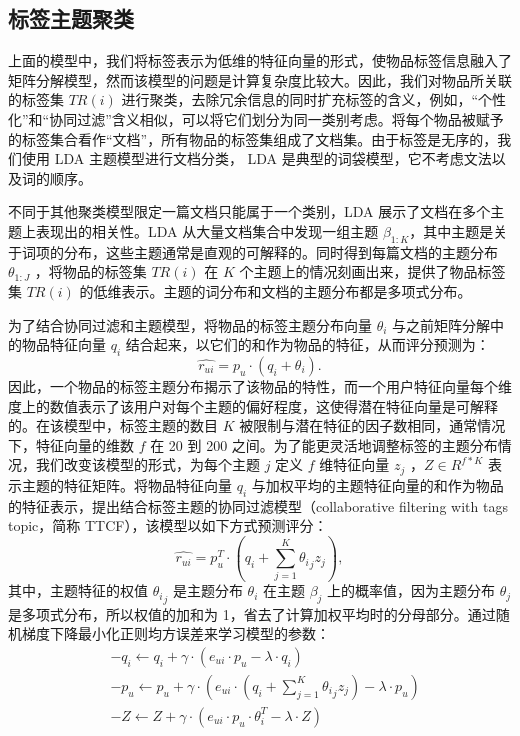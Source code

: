 \subsection{标签主题聚类}

上面的模型中，我们将标签表示为低维的特征向量的形式，使物品标签信息融入了矩阵分解模型，然而该模型的问题是计算复杂度比较大。因此，我们对物品所关联的标签集 $TR(i)$ 进行聚类，去除冗余信息的同时扩充标签的含义，例如，“个性化”和“协同过滤”含义相似，可以将它们划分为同一类别考虑。将每个物品被赋予的标签集合看作“文档”，所有物品的标签集组成了文档集。由于标签是无序的，我们使用 LDA 主题模型进行文档分类， LDA 是典型的词袋模型，它不考虑文法以及词的顺序。

不同于其他聚类模型限定一篇文档只能属于一个类别，LDA 展示了文档在多个主题上表现出的相关性。LDA 从大量文档集合中发现一组主题 $\beta_{1:K}$，其中主题是关于词项的分布，这些主题通常是直观的可解释的。同时得到每篇文档的主题分布 $\theta_{1:J}$ ，将物品的标签集 $TR(i)$ 在 $K$ 个主题上的情况刻画出来，提供了物品标签集 $TR(i)$ 的低维表示。主题的词分布和文档的主题分布都是多项式分布。

为了结合协同过滤和主题模型，将物品的标签主题分布向量 $\theta_i$ 与之前矩阵分解中的物品特征向量 $q_i$ 结合起来，以它们的和作为物品的特征，从而评分预测为：
\begin{equation}
\hat{r_{ui}} =  p_u \cdot (q_i + \theta_i).
\end{equation}
因此，一个物品的标签主题分布揭示了该物品的特性，而一个用户特征向量每个维度上的数值表示了该用户对每个主题的偏好程度，这使得潜在特征向量是可解释的。在该模型中，标签主题的数目 $K$ 被限制与潜在特征的因子数相同，通常情况下，特征向量的维数 $f$ 在 20 到 200 之间\cite{Koren2009Matrix}。为了能更灵活地调整标签的主题分布情况，我们改变该模型的形式，为每个主题 $j$ 定义 $f$ 维特征向量 $z_j$ ，$Z \in R^{f*K}$ 表示主题的特征矩阵。将物品特征向量 $q_i$ 与加权平均的主题特征向量的和作为物品的特征表示，提出结合标签主题的协同过滤模型（collaborative filtering with tags topic，简称 TTCF），该模型以如下方式预测评分：
\begin{equation}
\label{TTCF}
\hat{r_{ui}} =   p_u^T \cdot (q_i +   \sum\limits_{j =1}^K {  {\theta_i}_j   z_j}  ),
\end{equation}
其中，主题特征的权值 ${\theta_i}_j $ 是主题分布 $\theta_i$ 在主题 $\beta_j$ 上的概率值，因为主题分布 $\theta_j$ 是多项式分布，所以权值的加和为 1，省去了计算加权平均时的分母部分。通过随机梯度下降最小化正则均方误差来学习模型的参数：
\begin{equation}
\begin{aligned}
&-q_i \leftarrow q_i + \gamma \cdot(e_{ui} \cdot p_u -\lambda \cdot q_i)     \\
&-p_u \leftarrow p_u + \gamma \cdot(e_{ui} \cdot (q_i +  \sum\limits_{j =1}^K {  {\theta_i}_j   z_j}  )- \lambda \cdot p_u)    \\
&-Z \leftarrow Z + \gamma \cdot(e_{ui} \cdot p_u \cdot  \theta_i^T -\lambda \cdot Z)     \\
\end{aligned}
\end{equation}


